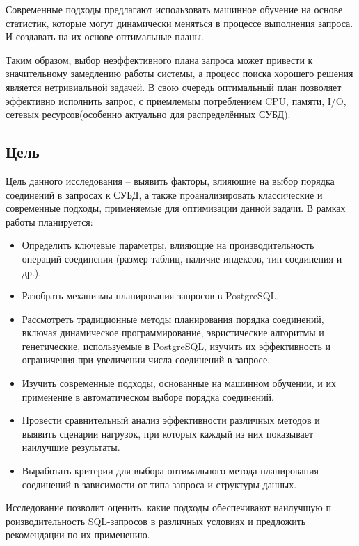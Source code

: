 \documentclass[12pt]{article}
\begin{document}
\begin{flushleft}
Современные подходы предлагают использовать машинное обучение на основе статистик,
которые могут динамически меняться в процессе выполнения запроса. И создавать на их
основе оптимальные планы.

Таким образом, выбор неэффективного плана запроса может привести
к значительному замедлению работы системы, а процесс поиска хорошего решения является
нетривиальной задачей. В свою очередь оптимальный план позволяет эффективно исполнить
запрос, с приемлемым потреблением CPU, памяти, I/O, сетевых ресурсов(особенно актуально
для распределённых СУБД).


\centering \subsection*{Цель}
\raggedright
Цель данного исследования – выявить факторы, влияющие на выбор порядка 
соединений в запросах к СУБД, а также проанализировать классические и
современные подходы, применяемые для оптимизации данной задачи.
В рамках работы планируется:
\begin{itemize}
    \item Определить ключевые параметры, влияющие на производительность 
    операций соединения (размер таблиц, наличие индексов, тип соединения и др.).
    \item Разобрать механизмы планирования запросов в PostgreSQL.
    \item Рассмотреть традиционные методы планирования порядка соединений, 
    включая динамическое программирование, эвристические алгоритмы и генетические, 
    используемые в PostgreSQL, изучить их эффективность и ограничения 
    при увеличении числа соединений в запросе.
    \item Изучить современные подходы, основанные на машинном обучении, и их
    применение в автоматическом выборе порядка соединений.
    \item Провести сравнительный анализ эффективности различных методов и 
    выявить сценарии нагрузок, при которых каждый из них показывает наилучшие 
    результаты.
    \item Выработать критерии для выбора оптимального метода планирования соединений
    в зависимости от типа запроса и структуры данных.
\end{itemize}

Исследование позволит оценить, какие подходы обеспечивают наилучшую п
роизводительность SQL-запросов в различных условиях и предложить рекомендации 
по их применению. 


\end{flushleft}
\end{document}
